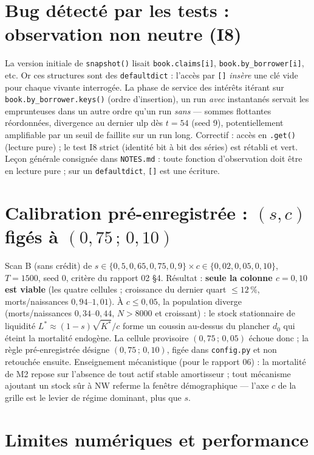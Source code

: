 \documentclass[11pt,a4paper]{article}
\newcommand{\NW}{\mathrm{NW}}
\newcommand{\code}[1]{\texttt{#1}}
\begin{document}
\section{Bug détecté par les tests : observation non neutre (I8)}

La version initiale de \code{snapshot()} lisait \code{book.claims[i]},
\code{book.by\_borrower[i]}, etc. Or ces structures sont des
\code{defaultdict} : l'accès par \code{[]} \emph{insère} une clé vide pour
chaque vivante interrogée. La phase de service des intérêts itérant sur
\code{book.by\_borrower.keys()} (ordre d'insertion), un run \emph{avec}
instantanés servait les emprunteuses dans un autre ordre qu'un run
\emph{sans} --- sommes flottantes réordonnées, divergence au dernier ulp dès
$t{=}54$ (seed 9), potentiellement amplifiable par un seuil de faillite sur
un run long. Correctif : accès en \code{.get()} (lecture pure) ; le test I8
strict (identité bit à bit des séries) est rétabli et vert. Leçon
générale consignée dans \code{NOTES.md} : toute fonction d'observation doit
être en lecture pure ; sur un \code{defaultdict}, \code{[]} est une
écriture.

\section{Calibration pré-enregistrée : $(s, c)$ figés à $(0{,}75\,;\,0{,}10)$}

Scan B (sans crédit) de $s \in \{0{,}5, 0{,}65, 0{,}75, 0{,}9\} \times
c \in \{0{,}02, 0{,}05, 0{,}10\}$, $T{=}1500$, seed 0, critère du rapport 02
§4. Résultat : \textbf{seule la colonne $c = 0{,}10$ est viable} (les quatre
cellules ; croissance du dernier quart $\le 12\,\%$, morts/naissances
$0{,}94$--$1{,}01$). À $c \le 0{,}05$, la population diverge
(morts/naissances $0{,}34$--$0{,}44$, $N > 8000$ et croissant) : le stock
stationnaire de liquidité $L^* \approx (1{-}s)\sqrt{K^*}/c$ forme un coussin
au-dessus du plancher $d_0$ qui éteint la mortalité endogène. La cellule
provisoire $(0{,}75\,;\,0{,}05)$ échoue donc ; la règle pré-enregistrée
désigne $(0{,}75\,;\,0{,}10)$, figée dans \code{config.py} et non retouchée
ensuite. Enseignement mécanistique (pour le rapport 06) : la mortalité de M2
repose sur l'absence de tout actif stable amortisseur ; tout mécanisme
ajoutant un stock sûr à $\NW$ referme la fenêtre démographique --- l'axe $c$
de la grille est le levier de régime dominant, plus que $s$.

\section{Limites numériques et performance}
\end{document}
